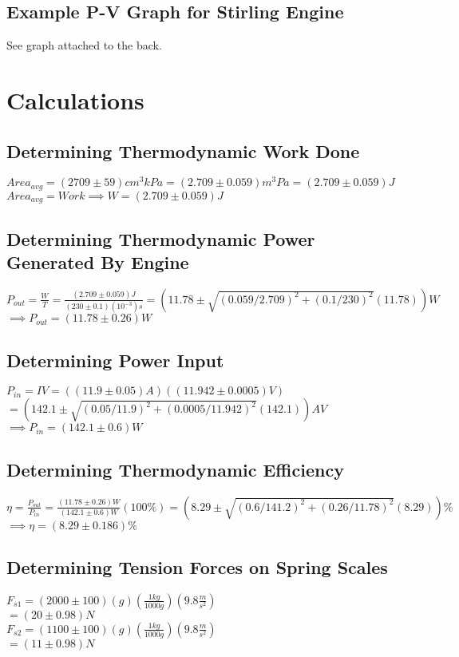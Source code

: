 \documentclass{article}
\begin{document}
\subsection{Example P-V Graph for Stirling Engine}
See graph attached to the back.


\section{Calculations}
\subsection{Determining Thermodynamic Work Done}

$Area_{avg}=(2709\pm59) cm^3kPa=(2.709\pm0.059)m^3Pa=(2.709\pm0.059)J$\\
$Area_{avg}=Work\implies W=(2.709\pm0.059)J$
\subsection{Determining Thermodynamic Power Generated By Engine}
$P_{out}=\frac{W}{T}=\frac{(2.709\pm0.059)J}{(230\pm0.1)(10^{-3})s}=(11.78\pm \sqrt{(0.059/2.709)^2+(0.1/230)^2}(11.78))W$\\
$\implies P_{out}=(11.78\pm0.26)W$
\subsection{Determining Power Input}
$P_{in}=IV=((11.9\pm0.05)A)((11.942\pm0.0005)V)$\\
$=(142.1\pm\sqrt{(0.05/11.9)^2+(0.0005/11.942)^2}(142.1))AV$\\
$\implies P_{in}=(142.1\pm0.6)W$
\subsection{Determining Thermodynamic Efficiency}
$\eta=\frac{P_{out}}{P_{in}}=\frac{(11.78\pm0.26)W}{(142.1\pm0.6)W}(100\%)=(8.29\pm\sqrt{(0.6/141.2)^2+(0.26/11.78)^2}(8.29))\%$
$\implies\eta=(8.29\pm0.186)\%$
\subsection{Determining Tension Forces on Spring Scales}
$F_{s1}=(2000\pm100)(g)(\frac{1kg}{1000g})(9.8\frac{m}{s^2})$\\
$=(20\pm0.98)N$\\
$F_{s2}=(1100\pm100)(g)(\frac{1kg}{1000g})(9.8\frac{m}{s^2})$\\
$=(11\pm0.98)N$
\end{document}
